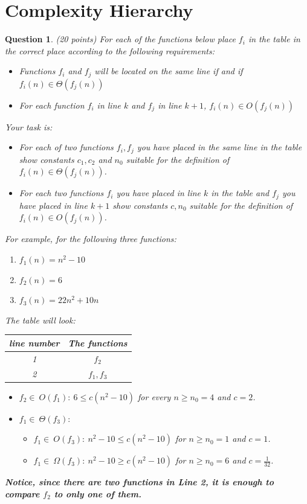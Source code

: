 \documentclass[a4paper]{article}
\theoremstyle{remarksStyle}
\theoremstyle{questionStyle}
\newtheorem{question}{Question}
\theoremstyle{answerStyle}
\begin{document}
\section{Complexity Hierarchy}
\begin{question} (20 points)
For each of the functions below place $f_{i}$ in the table in the correct place according to the following requirements:
\begin{itemize}
\item Functions $f_{i}$ and $f_{j}$ will be located on the same line if and if $f_{i}(n) \in \Theta(f_{j}(n))$  
\item For each function $f_{i}$ in line $k$ and $f_{j}$ in line $k+1$, $f_{i}(n) \in O(f_{j}(n))$
\end{itemize}
Your task is:
\begin{itemize}
    \item For each of two functions $f_{i}, f_{j}$ you have placed in the same line in the table show constants $c_1, c_2$ and $n_0$ suitable for the definition of $f_{i}(n) \in \Theta(f_{j}(n))$.
    \item For each two functions $f_{i}$ you have placed in line $k$ in the table and $f_{j}$ you have  placed in line $k+1$ show constants $c, n_0$ suitable for the definition of $f_{i}(n) \in O(f_{j}(n))$.
\end{itemize}

\begin{boxxed}
For example, for the following three functions:
\begin{enumerate}
    \item $f_{1}(n) = n^2 -10$
      \item $f_{2}(n) = 6$
    \item $f_{3}(n) = 22 n^2 + 10n$
\end{enumerate}
The table will look:
\begin{center}
\begin{tabular}{||c | c ||} 
 \hline
 line number & The functions \\ [0.5ex] 
 \hline\hline
 1 &  $f_{2}$ \\ 
 \hline
 2 &  $f_{1},f_{3}$\\ 
  \hline
\end{tabular}
\end{center}
\begin{itemize}
    \item $f_{2} \in \ O(f_{1}): \ 6 \leq c(n^2 -10)$ for every $n \ge n_0 =4$ and $c=2$.
   \item  $f_{1} \in \ \Theta(f_{3}):$
      \begin{itemize}
          \item   $f_{1} \in \ O(f_{3}): \ n^2 -10 \leq c(n^2 -10)$ for $n \ge n_0 =1$ and $c=1$.
         \item $f_{1} \in \ \Omega(f_{3}): \ n^2 -10 \geq c(n^2 -10)$ for $n \ge n_0 =6$ and $c=\frac{1}{32}$.
     \end{itemize} 
\end{itemize} 
\textbf{Notice, since there are two functions in Line 2, it is enough to compare $f_{2}$ to only one of them.}
\end{boxxed}


\end{question}
\end{document}
